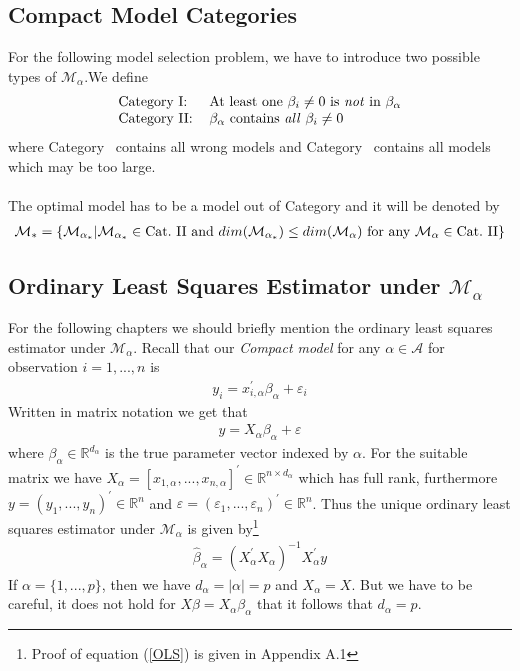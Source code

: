 \documentclass[Research_Module_ES.tex]{subfiles}
\begin{document}
\subsection{Compact Model Categories} \label{chapter_compact_model}
For the following model selection problem, we have to introduce two possible types of $\mathcal{M}_\alpha$.We define
\begin{align*}
\begin{tabular}{ll}
Category~\RM{1}:& At least one $\beta_i\neq 0$ is \textit{not} in $\beta_\alpha$\\
Category~\RM{2}:& $\beta_\alpha$ contains \textit{all} $\beta_i\neq 0$
\end{tabular}
\end{align*}
where Category~ contains all wrong models and Category~ contains all models which may be too large.\\\\
The optimal model has to be a model out of Category  and it will be denoted by
\begin{align*}
\mathcal{M}_\ast=\{\mathcal{M}_{\alpha_\ast}|\mathcal{M}_{\alpha_\ast}\in \text{Cat.~\RM{2}~and~} dim(\mathcal{M}_{\alpha_\ast})\leq dim(\mathcal{M}_{\alpha})\text{~for~any~}\mathcal{M}_{\alpha}\in \text{Cat.~\RM{2}} \}
\end{align*}

\subsection{Ordinary Least Squares Estimator under $\mathcal{M}_\alpha$}
For the following chapters we should briefly mention the ordinary least squares estimator under $\mathcal{M}_\alpha$. Recall that our \textit{Compact model} for any $\alpha\in\mathcal{A}$ for observation $i=1,...,n$ is
\begin{align*}
	y_i=x_{i,\alpha}^\prime\beta_\alpha+\varepsilon_i
\end{align*}
Written in matrix notation we get that
\begin{align}
	y=X_\alpha \beta_\alpha+\varepsilon  \label{CM_model_matrix}
\end{align}
where $\beta_\alpha\in\mathbb{R}^{d_\alpha}$ is the true parameter vector indexed by $\alpha$. For the suitable matrix we have $X_\alpha=[x_{1,\alpha},...,x_{n,\alpha}]^\prime \in\mathbb{R}^{n\times d_\alpha}$
which has full rank, furthermore $y=(y_1,...,y_n)^\prime\in\mathbb{R}^n$ and $\varepsilon=(\varepsilon_1,...,\varepsilon_n)^\prime\in\mathbb{R}^n$. Thus the unique 
ordinary least squares estimator under $\mathcal{M}_\alpha$ is given by\footnote{Proof of equation (\ref{OLS}) is given in Appendix A.1}
\begin{align}
	\hat{\beta}_\alpha=(X_\alpha^\prime X_\alpha)^{-1}X_\alpha^\prime y
	\label{OLS}
\end{align}
If $\alpha=\{1,...,p\}$, then we have $d_\alpha=|\alpha|=p$ and $X_\alpha=X$. But we have to be careful, it does not hold for $X\beta=X_\alpha\beta_\alpha$ that it follows that $d_\alpha=p$.
\end{document}
